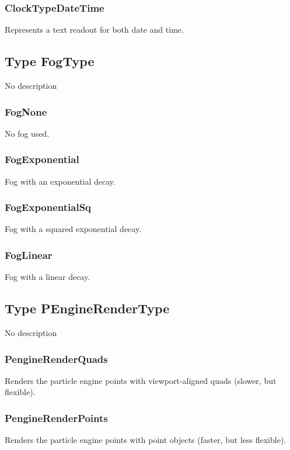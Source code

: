 \documentclass[10pt]{book}
\begin{document}
\subsubsection{ClockTypeDateTime \label{T:ClockType|ClockTypeDateTime}}
Represents a text readout for both date and time.

\subsection{Type FogType \label{T:FogType}}
No description

\subsubsection{FogNone \label{T:FogType|FogNone}}
No fog used.

\subsubsection{FogExponential \label{T:FogType|FogExponential}}
Fog with an exponential decay.

\subsubsection{FogExponentialSq \label{T:FogType|FogExponentialSq}}
Fog with a squared exponential decay.

\subsubsection{FogLinear \label{T:FogType|FogLinear}}
Fog with a linear decay.

\subsection{Type PEngineRenderType \label{T:PEngineRenderType}}
No description

\subsubsection{PengineRenderQuads \label{T:PEngineRenderType|PengineRenderQuads}}
Renders the particle engine points with viewport-aligned quads (slower, but flexible).

\subsubsection{PengineRenderPoints \label{T:PEngineRenderType|PengineRenderPoints}}
Renders the particle engine points with point objects (faster, but less flexible).
\end{document}

